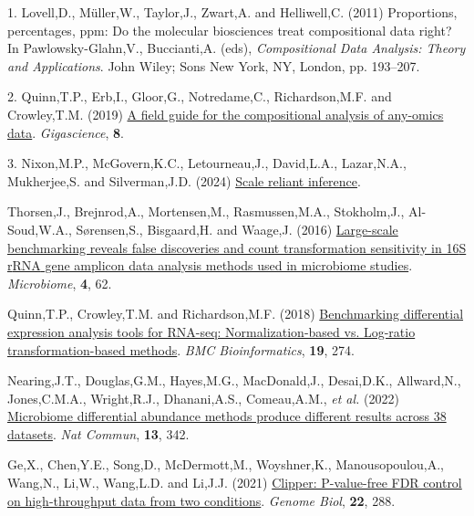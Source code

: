 \documentclass[
]{article}
\newlength{\cslhangindent}
\newenvironment{CSLReferences}[2] %
 {\begin{list}{}{%
  \setlength{\itemindent}{0pt}
  \setlength{\leftmargin}{0pt}
  \setlength{\parsep}{0pt}
  \ifodd #1
   \setlength{\leftmargin}{\cslhangindent}
   \setlength{\itemindent}{-1\cslhangindent}
  \fi
  \setlength{\itemsep}{#2\baselineskip}}}
 {\end{list}}
\providecommand{\DIFadd}[1]{{\protect\color{blue}\uwave{#1}}} %
\providecommand{\DIFaddbegin}{} %
\providecommand{\DIFaddend}{} %
\newcommand{\DIFaddincludegraphics}[2][]{{\color{blue}\fbox{\DIFOincludegraphics[#1]{#2}}}} %
\DeclareRobustCommand{\DIFaddbegin}{\DIFOaddbegin \let\includegraphics\DIFaddincludegraphics} %
\DeclareRobustCommand{\DIFaddend}{\DIFOaddend \let\includegraphics\DIFOincludegraphics} %
\begin{document}
\label{refs}
\begin{CSLReferences}{1}{1}
1. Lovell,D., Müller,W., Taylor,J., Zwart,A. and Helliwell,C. (2011)
Proportions, percentages, ppm: Do the molecular biosciences treat
compositional data right? In Pawlowsky-Glahn,V., Buccianti,A. (eds),
\emph{Compositional Data Analysis: Theory and Applications}. John Wiley;
Sons New York, NY, London, pp. 193--207.

2. Quinn,T.P., Erb,I., Gloor,G., Notredame,C., Richardson,M.F. and
Crowley,T.M. (2019) \href{https://doi.org/10.1093/gigascience/giz107}{A
field guide for the compositional analysis of any-omics data}.
\emph{Gigascience}, \textbf{8}.

3. Nixon,M.P., McGovern,K.C., Letourneau,J., David,L.A., Lazar,N.A.,
Mukherjee,S. and Silverman,J.D. (2024)
\href{https://arxiv.org/abs/2201.03616}{Scale reliant inference}.

 \DIFaddbegin \DIFadd{4. }\DIFaddend Thorsen,J., Brejnrod,A., Mortensen,M., Rasmussen,M.A., Stokholm,J.,
Al-Soud,W.A., Sørensen,S., Bisgaard,H. and Waage,J. (2016)
\href{https://doi.org/10.1186/s40168-016-0208-8}{Large-scale
benchmarking reveals false discoveries and count transformation
sensitivity in 16{S} r{RNA} gene amplicon data analysis methods used in
microbiome studies}. \emph{Microbiome}, \textbf{4}, 62.

 \DIFaddbegin \DIFadd{5. }\DIFaddend Quinn,T.P., Crowley,T.M. and Richardson,M.F. (2018)
\href{https://doi.org/10.1186/s12859-018-2261-8}{Benchmarking
differential expression analysis tools for RNA-seq: Normalization-based
vs. Log-ratio transformation-based methods}. \emph{BMC Bioinformatics},
\textbf{19}, 274.

 \DIFaddbegin \DIFadd{6. }\DIFaddend Nearing,J.T., Douglas,G.M., Hayes,M.G., MacDonald,J., Desai,D.K.,
Allward,N., Jones,C.M.A., Wright,R.J., Dhanani,A.S., Comeau,A.M.,
\emph{et al.} (2022)
\href{https://doi.org/10.1038/s41467-022-28034-z}{Microbiome
differential abundance methods produce different results across 38
datasets}. \emph{Nat Commun}, \textbf{13}, 342.

 \DIFaddbegin \DIFadd{7. }\DIFaddend Ge,X., Chen,Y.E., Song,D., McDermott,M., Woyshner,K.,
Manousopoulou,A., Wang,N., Li,W., Wang,L.D. and Li,J.J. (2021)
\href{https://doi.org/10.1186/s13059-021-02506-9}{Clipper: P-value-free
FDR control on high-throughput data from two conditions}. \emph{Genome
Biol}, \textbf{22}, 288.


\end{CSLReferences}
\end{document}
